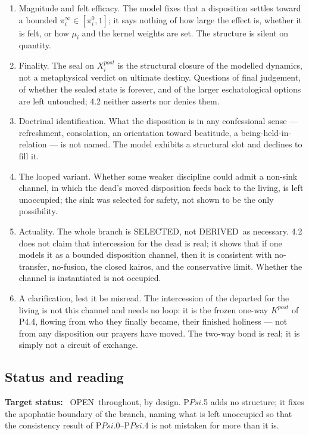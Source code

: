 \documentclass[11pt,a4paper]{article}
\def\Psi{Psi}%
\def\mathrm#1{#1}%
\def\emph#1{#1}%
\newcommand{\stDerived}{\textcolor{cDer}{\textsf{\small DERIVED}}}
\newcommand{\stSelected}{\textcolor{cSel}{\textsf{\small SELECTED}}}
\newcommand{\stOpen}{\textcolor{cOpn}{\textsf{\small OPEN}}}
\theoremstyle{definition}
\theoremstyle{plain}
\theoremstyle{remark}
\begin{document}
\begin{enumerate}[label=\textup{(UO\arabic*)},leftmargin=1.4cm]
\item \emph{Magnitude and felt efficacy.} The model fixes that a disposition settles toward a
bounded \(\pi_i^{\infty}\in[\pi_i^{0},1]\); it says nothing of how large the effect is, whether
it is felt, or how \(\mu_i\) and the kernel weights are set. The structure is silent on
quantity.
\item \emph{Finality.} The seal on \(X_i^{\mathrm{post}}\) is the structural closure of the
\emph{modelled} dynamics, not a metaphysical verdict on ultimate destiny. Questions of final
judgement, of whether the sealed state is forever, and of the larger eschatological options are
left untouched; 4.2 neither asserts nor denies them.
\item \emph{Doctrinal identification.} What the disposition \emph{is} in any confessional
sense --- refreshment, consolation, an orientation toward beatitude, a being-held-in-relation
--- is not named. The model exhibits a structural slot and declines to fill it.
\item \emph{The looped variant.} Whether some weaker discipline could admit a non-sink channel,
in which the dead's moved disposition feeds back to the living, is left unoccupied; the sink was
\emph{selected} for safety, not shown to be the only possibility.
\item \emph{Actuality.} The whole branch is \stSelected, not \stDerived\ as necessary. 4.2 does
not claim that intercession for the dead is real; it shows that \emph{if} one models it as a
bounded disposition channel, \emph{then} it is consistent with no-transfer, no-fusion, the
closed kairos, and the conservative limit. Whether the channel is instantiated is not occupied.
\item \emph{A clarification, lest it be misread.} The intercession \emph{of} the departed
\emph{for} the living is not this channel and needs no loop: it is the frozen one-way
\(K^{\mathrm{post}}\) of P4.4, flowing from who they finally became, their finished holiness ---
not from any disposition our prayers have moved. The two-way bond is real; it is simply not a
circuit of exchange.
\end{enumerate}

\subsection{Status and reading}

\textbf{Target status:}~
\stOpen\ throughout, by design. P$\Psi$.5 adds no structure; it fixes the apophatic boundary of
the branch, naming what is left unoccupied so that the consistency result of P$\Psi$.0--P$\Psi$.4
is not mistaken for more than it is.
\end{document}
